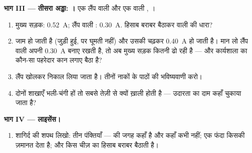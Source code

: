 \begin{problem}[{सप्ताहांत समस्या --- इलेक्ट्रॉनिकी कार्यशाला में
योग्यता का दिन; चार अड्डे, हर एक पर एक ऐमीटर; शागिर्द का
लाइसेंस}]
\medskip\noindent\textbf{भाग III --- तीसरा अड्डा: ।}
एक लैंप वाली  और एक  वाली , ।
\begin{enumerate}[resume]
  \item मुख्य सड़क: \qty{0.52}{A}; लैंप वाली : \qty{0.30}{A}.
        हिसाब बराबर बैठाकर  वाली  की धारा?
  \item {} जाम हो जाती है (जुड़ी हुई, पर घूमती नहीं) और उसकी 
        चढ़कर \qty{0.40}{A} हो जाती है। मान लो लैंप वाली  अपनी
        \qty{0.30}{A} बनाए रखती है, तो अब मुख्य सड़क कितनी ढो रही है
        --- और कार्यशाला का कौन-सा पहरेदार कान लगाए बैठा है?
  \item लैंप खोलकर निकाल लिया जाता है। तीनों नाकों के पाठों की
        भविष्यवाणी करो।
  \item दोनों शाखाएँ भली-चंगी हों तो  सबसे तेज़ी से क्यों ख़ाली
        होती है --- उदारता का दाम कहाँ चुकाया जाता है?
\end{enumerate}

\medskip\noindent\textbf{भाग IV --- लाइसेंस।}
\begin{enumerate}[resume]
  \item शागिर्द की शपथ लिखो: तीन पंक्तियाँ ---  की जगह कहाँ है
        और कहाँ कभी नहीं; एक फंदा किसकी ज़मानत देता है; और  किस
        चीज़ का हिसाब बराबर बैठाती है।
\end{enumerate}
\end{problem}
